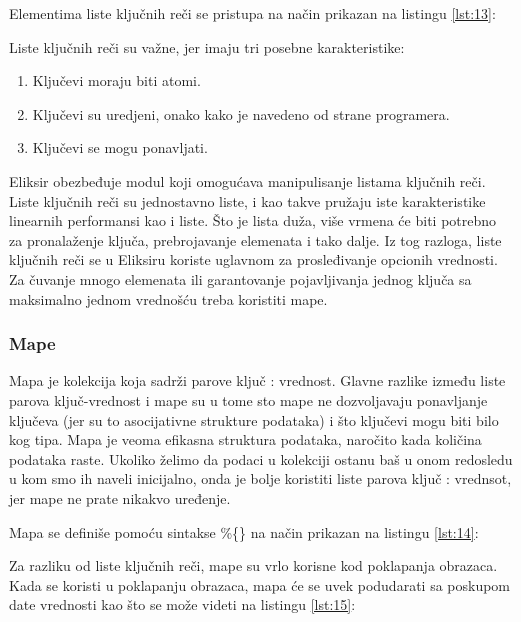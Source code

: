 \documentclass[12pt,oneside]{memoir}
\begin{document}
Elementima liste ključnih reči se pristupa na način prikazan na listingu \ref{lst:13}:



Liste ključnih reči su važne, jer imaju tri posebne karakteristike:
\begin{enumerate}
\item{Ključevi moraju biti atomi.}
\item{Ključevi su uredjeni, onako kako je navedeno od strane programera.}
\item{Ključevi se mogu ponavljati.}
\end{enumerate}

 Eliksir obezbeđuje modul koji omogućava manipulisanje listama ključnih reči. Liste ključnih reči su jednostavno liste, i kao takve pružaju iste karakteristike linearnih performansi kao i liste. Što je lista duža, više vrmena će biti potrebno za pronalaženje ključa, prebrojavanje elemenata i tako dalje. Iz tog razloga, liste ključnih reči se u Eliksiru koriste uglavnom za prosleđivanje opcionih vrednosti. Za čuvanje mnogo elemenata ili garantovanje pojavljivanja jednog ključa sa maksimalno jednom vrednošću treba koristiti mape.
 
\subsubsection{Mape}
Mapa je kolekcija koja sadrži parove ključ : vrednost. Glavne razlike između liste parova ključ-vrednost i mape su u tome sto mape ne dozvoljavaju ponavljanje ključeva (jer su to asocijativne strukture podataka) i što ključevi mogu biti bilo kog tipa. Mapa je veoma efikasna struktura podataka, naročito kada količina podataka raste. Ukoliko želimo da podaci u kolekciji ostanu baš u onom redosledu u kom smo ih naveli inicijalno, onda je bolje koristiti liste parova ključ : vrednsot, jer mape ne prate nikakvo uređenje.

Mapa se definiše pomoću sintakse \%\{\} na način prikazan na listingu \ref{lst:14}:



Za razliku od liste ključnih reči, mape su vrlo korisne kod poklapanja obrazaca. Kada se koristi u poklapanju obrazaca, mapa će se uvek podudarati sa poskupom date vrednosti kao što se može videti na listingu \ref{lst:15}:
 
\end{document}
